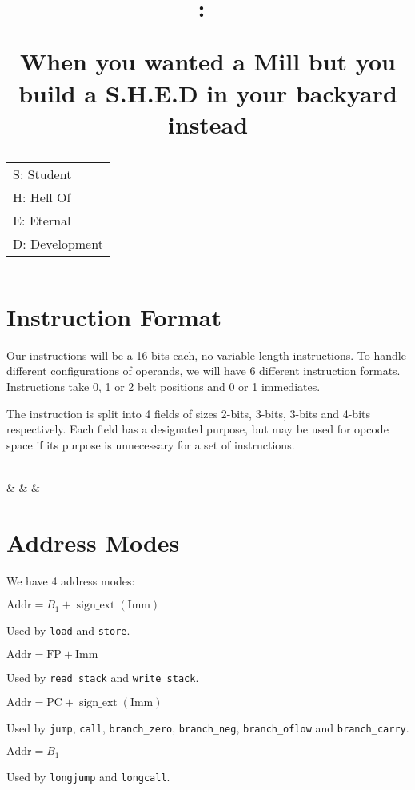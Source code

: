 \documentclass{article}
\title{
	\vspace{2in}
	\textmd{\textbf{\hmwkClass:\ \hmwkTitle}}
	
	\vspace{0.5in}
	\normalsize{When you wanted a Mill but you build a S.H.E.D in your backyard instead}\\
	\begin{tabular}{l}
		\normalsize{S: Student}\\
		\normalsize{H: Hell Of}\\
		\normalsize{E: Eternal}\\
		\normalsize{D: Development}\\
	\end{tabular}
	

	\vspace{3in}
}
\author{\hmwkAuthorName}
\date{}
\begin{document}
\maketitle

\pagebreak

\section{Instruction Format}

	Our instructions will be a 16-bits each, no variable-length instructions.
	To handle different configurations of operands, we will have 6 different instruction formats.
	Instructions take 0, 1 or 2 belt positions and 0 or 1 immediates.

	The instruction is split into 4 fields of sizes 2-bits, 3-bits, 3-bits and 4-bits respectively.
	Each field has a designated purpose, but may be used for opcode space if its purpose is unnecessary for a set of instructions.

	\vspace{5mm}

	\begin{bytefield}[endianness=big,bitwidth=3em,bitheight=6ex]{16}
		 \\
		 &
		 &
		 &
		 \\
	\end{bytefield}


\section{Address Modes}

	We have 4 address modes:
	\begin{description}[font=\sffamily\bfseries]
		\item[data] \(\textrm{Addr} = B_1 + \operatorname{sign\_ext}\left(\textrm{Imm}\right)\)

			Used by \texttt{load} and \texttt{store}.

		\item[stack] \(\textrm{Addr} = \textrm{FP} + \textrm{Imm}\)

			Used by \texttt{read\_stack} and \texttt{write\_stack}.

		\item[code] \(\textrm{Addr} = \textrm{PC} + \operatorname{sign\_ext}\left(\textrm{Imm}\right)\)

			Used by \texttt{jump}, \texttt{call}, \texttt{branch\_zero}, \texttt{branch\_neg}, \texttt{branch\_oflow} and \texttt{branch\_carry}.

		\item[long code] \(\textrm{Addr} = B_1\)

			Used by \texttt{longjump} and \texttt{longcall}.

	\end{description}
\end{document}

